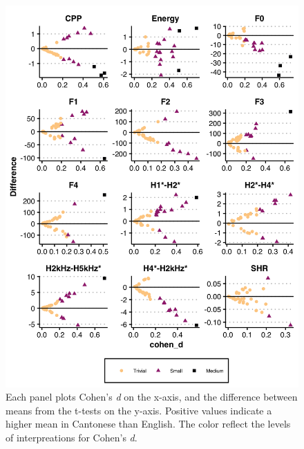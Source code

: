 \begin{figure}[htbp]
    \begin{center}
    \includegraphics[width=0.9\linewidth]{figures/ch3_cohend_part1_5in.png} 
    \caption{Each panel plots Cohen's \textit{d} on the x-axis, and the difference between means from the t-tests on the y-axis. Positive values indicate a higher mean in Cantonese than English. The color reflect the levels of interpreations for Cohen's \textit{d}.}
    \label{ch3:fig:cohendmeasure}
    \end{center}
\end{figure}

